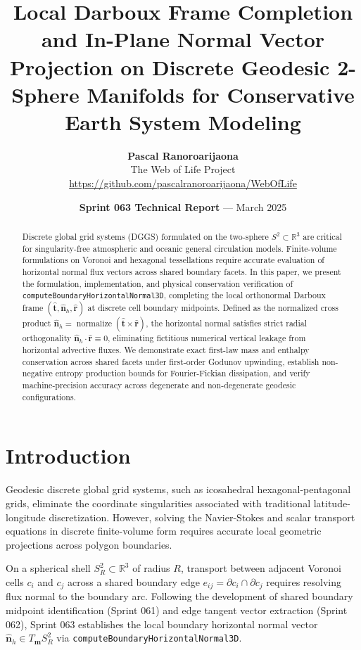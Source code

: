 \documentclass[11pt,a4paper]{article}
\title{\textbf{Local Darboux Frame Completion and In-Plane Normal Vector Projection on Discrete Geodesic 2-Sphere Manifolds for Conservative Earth System Modeling}}
\author{
  \textbf{Pascal Ranoroarijaona} \\
  The Web of Life Project \\
  \url{https://github.com/pascalranoroarijaona/WebOfLife}
}
\date{\textbf{Sprint 063 Technical Report} --- March 2025}
\begin{document}
\maketitle

\begin{abstract}
Discrete global grid systems (DGGS) formulated on the two-sphere $S^2 \subset \mathbb{R}^3$ are critical for singularity-free atmospheric and oceanic general circulation models. Finite-volume formulations on Voronoi and hexagonal tessellations require accurate evaluation of horizontal normal flux vectors across shared boundary facets. In this paper, we present the formulation, implementation, and physical conservation verification of \texttt{computeBoundaryHorizontalNormal3D}, completing the local orthonormal Darboux frame $(\hat{\mathbf{t}}, \hat{\mathbf{n}}_h, \hat{\mathbf{r}})$ at discrete cell boundary midpoints. Defined as the normalized cross product $\hat{\mathbf{n}}_h = \operatorname{normalize}(\hat{\mathbf{t}} \times \hat{\mathbf{r}})$, the horizontal normal satisfies strict radial orthogonality $\hat{\mathbf{n}}_h \cdot \hat{\mathbf{r}} \equiv 0$, eliminating fictitious numerical vertical leakage from horizontal advective fluxes. We demonstrate exact first-law mass and enthalpy conservation across shared facets under first-order Godunov upwinding, establish non-negative entropy production bounds for Fourier-Fickian dissipation, and verify machine-precision accuracy across degenerate and non-degenerate geodesic configurations.
\end{abstract}

\section{Introduction}
Geodesic discrete global grid systems, such as icosahedral hexagonal-pentagonal grids, eliminate the coordinate singularities associated with traditional latitude-longitude discretization. However, solving the Navier-Stokes and scalar transport equations in discrete finite-volume form requires accurate local geometric projections across polygon boundaries.

On a spherical shell $S^2_R \subset \mathbb{R}^3$ of radius $R$, transport between adjacent Voronoi cells $c_i$ and $c_j$ across a shared boundary edge $e_{ij} = \partial c_i \cap \partial c_j$ requires resolving flux normal to the boundary arc. Following the development of shared boundary midpoint identification (Sprint 061) and edge tangent vector extraction (Sprint 062), Sprint 063 establishes the local boundary horizontal normal vector $\hat{\mathbf{n}}_h \in T_{\mathbf{m}}S^2_R$ via \texttt{computeBoundaryHorizontalNormal3D}.
\end{document}
